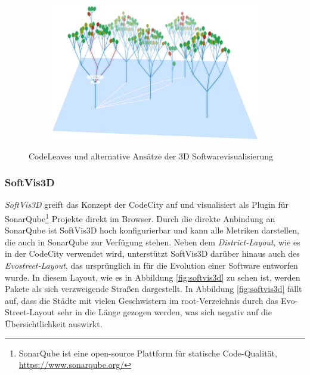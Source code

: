 \begin{figure}[htb]
\begin{subfigure}[b]{\fwidth}
  	 \label{fig:code-universe}
  \end{subfigure}
  \hfill
  \begin{subfigure}[b]{\fwidth}
  	\includegraphics[width=\textwidth]{figures/code-leaves}
  	 \label{fig:code-leaves}
  \end{subfigure}
  \caption{CodeLeaves und alternative Ansätze der 3D Softwarevisualisierung} \label{fig:alternatives}
\end{figure}

\subsubsection*{SoftVis3D}
\textit{SoftVis3D} greift das Konzept der CodeCity auf und visualisiert als Plugin für SonarQube\footnote{SonarQube ist eine open-source Plattform für statische Code-Qualität, \url{https://www.sonarqube.org/}} Projekte direkt im Browser. Durch die direkte Anbindung an SonarQube ist SoftVis3D hoch konfigurierbar und kann alle Metriken darstellen, die auch in SonarQube zur Verfügung stehen. Neben dem \emph{District-Layout}, wie es in der CodeCity verwendet wird, unterstützt SoftVis3D darüber hinaus auch des \emph{Evostreet-Layout}, das ursprünglich in \cite{steinbruckner2013consistent} für die Evolution einer Software entworfen wurde. In diesem Layout, wie es in Abbildung \ref{fig:softvis3d} zu sehen ist, werden Pakete als sich verzweigende Straßen dargestellt. In Abbildung \ref{fig:softvis3d} fällt auf, dass die Städte mit vielen Geschwistern im root-Verzeichnis durch das Evo-Street-Layout sehr in die Länge gezogen werden, was sich negativ auf die Übersichtlichkeit auswirkt.

